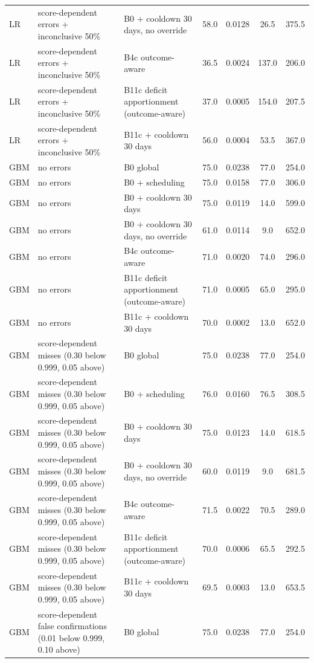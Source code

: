\begin{longtable}{lp{5.2cm}p{4.4cm}cccc}
LR & score-dependent errors + inconclusive 50\% & B0 + cooldown 30 days, no override & 58.0 & 0.0128 & 26.5 & 375.5 \\
LR & score-dependent errors + inconclusive 50\% & B4c outcome-aware & 36.5 & 0.0024 & 137.0 & 206.0 \\
LR & score-dependent errors + inconclusive 50\% & B11c deficit apportionment (outcome-aware) & 37.0 & 0.0005 & 154.0 & 207.5 \\
LR & score-dependent errors + inconclusive 50\% & B11c + cooldown 30 days & 56.0 & 0.0004 & 53.5 & 367.0 \\
GBM & no errors & B0 global & 75.0 & 0.0238 & 77.0 & 254.0 \\
GBM & no errors & B0 + scheduling & 75.0 & 0.0158 & 77.0 & 306.0 \\
GBM & no errors & B0 + cooldown 30 days & 75.0 & 0.0119 & 14.0 & 599.0 \\
GBM & no errors & B0 + cooldown 30 days, no override & 61.0 & 0.0114 & 9.0 & 652.0 \\
GBM & no errors & B4c outcome-aware & 71.0 & 0.0020 & 74.0 & 296.0 \\
GBM & no errors & B11c deficit apportionment (outcome-aware) & 71.0 & 0.0005 & 65.0 & 295.0 \\
GBM & no errors & B11c + cooldown 30 days & 70.0 & 0.0002 & 13.0 & 652.0 \\
GBM & score-dependent misses (0.30 below 0.999, 0.05 above) & B0 global & 75.0 & 0.0238 & 77.0 & 254.0 \\
GBM & score-dependent misses (0.30 below 0.999, 0.05 above) & B0 + scheduling & 76.0 & 0.0160 & 76.5 & 308.5 \\
GBM & score-dependent misses (0.30 below 0.999, 0.05 above) & B0 + cooldown 30 days & 75.0 & 0.0123 & 14.0 & 618.5 \\
GBM & score-dependent misses (0.30 below 0.999, 0.05 above) & B0 + cooldown 30 days, no override & 60.0 & 0.0119 & 9.0 & 681.5 \\
GBM & score-dependent misses (0.30 below 0.999, 0.05 above) & B4c outcome-aware & 71.5 & 0.0022 & 70.5 & 289.0 \\
GBM & score-dependent misses (0.30 below 0.999, 0.05 above) & B11c deficit apportionment (outcome-aware) & 70.0 & 0.0006 & 65.5 & 292.5 \\
GBM & score-dependent misses (0.30 below 0.999, 0.05 above) & B11c + cooldown 30 days & 69.5 & 0.0003 & 13.0 & 653.5 \\
GBM & score-dependent false confirmations (0.01 below 0.999, 0.10 above) & B0 global & 75.0 & 0.0238 & 77.0 & 254.0 \\

\end{longtable}
